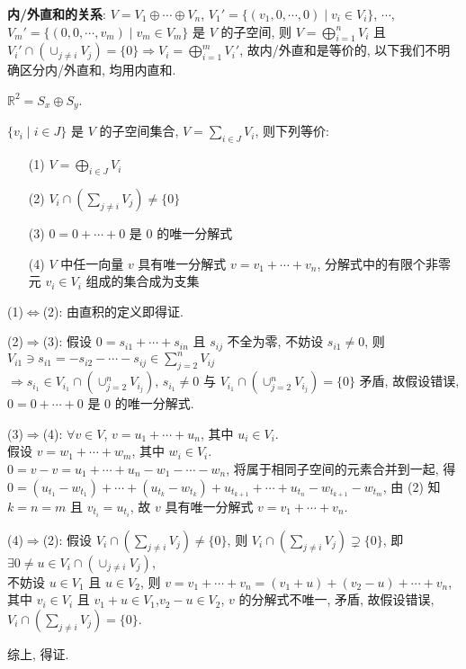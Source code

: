 \documentclass{note}
\begin{document}
\textbf{内/外直和的关系}:
$V=V_1\oplus\cdots\oplus V_n$, $V_1'=\{(v_1,0,\cdots,0)\mid v_i\in V_i\}$, $\cdots$, $V_m'=\{(0,0,\cdots,v_m)\mid v_m\in V_m\}$ 是 $V$ 的子空间, 则 $V=\bigoplus_{i=1}^nV_i$ 且 $V_i'\cap(\cup_{j\neq i}V_j)=\{0\}\Longrightarrow V_i=\bigoplus_{i=1}^mV_i'$, 故内/外直和是等价的, 以下我们不明确区分内/外直和, 均用内直和.

\begin{eg}
    $\mathbb{R}^2=S_x\oplus S_y$.
\end{eg}

\begin{thm}[(课本定理 1.5)]
    $\{v_i\mid i\in J\}$ 是 $V$ 的子空间集合, $V=\sum_{i\in J}V_i$, 则下列等价:
    \begin{itemize}
        \item[(1)] $V=\bigoplus_{i\in J}V_i$
        \item[(2)] $V_i\cap(\sum_{j\neq i}V_j)\neq\{0\}$
        \item[(3)] $0=0+\cdots+0$ 是 $0$ 的唯一分解式
        \item[(4)] $V$ 中任一向量 $v$ 具有唯一分解式 $v=v_1+\cdots+v_n$, 分解式中的有限个非零元 $v_i\in V_i$ 组成的集合成为支集
    \end{itemize}
\end{thm}
\begin{pf}
    (1)$\Longleftrightarrow$(2): 由直积的定义即得证.

    (2)$\Longrightarrow$(3): 假设 $0=s_{i1}+\cdots+s_{in}$ 且 $s_{ij}$ 不全为零, 不妨设 $s_{i1}\neq 0$, 则 $V_{i1}\ni s_{i1}=-s_{i2}-\cdots-s_{ij}\in\sum_{j=2}^nV_{ij}$\\
    $\Longrightarrow s_{i_1}\in V_{i_1}\cap(\cup_{j=2}^nV_{i_j})$, $s_{i_1}\neq 0$ 与 $V_{i_1}\cap(\cup_{j=2}^nV_{i_j})=\{0\}$ 矛盾, 故假设错误, $0=0+\cdots+0$ 是 $0$ 的唯一分解式.

    (3)$\Longrightarrow$(4): $\forall v\in V$, $v=u_1+\cdots+u_n$, 其中 $u_i\in V_i$.\\
    假设 $v=w_1+\cdots+w_m$, 其中 $w_i\in V_i$.\\
    $0=v-v=u_1+\cdots+u_n-w_1-\cdots-w_n$, 将属于相同子空间的元素合并到一起, 得 $0=(u_{t_1}-w_{t_1})+\cdots+(u_{t_k}-w_{t_k})+u_{t_{k+1}}+\cdots+u_{t_n}-w_{t_{k+1}}-w_{t_m}$, 由 (2) 知 $k=n=m$ 且 $v_{t_i}=u_{t_i}$, 故 $v$ 具有唯一分解式 $v=v_1+\cdots+v_n$.

    (4)$\Longrightarrow$(2): 假设 $V_i\cap(\sum_{j\neq i}V_j)\neq\{0\}$, 则 $V_i\cap(\sum_{j\neq i}V_j)\supsetneq\{0\}$, 即 $\exists 0\neq u\in V_i\cap(\cup_{j\neq i}V_j)$,\\
    不妨设 $u\in V_1$ 且 $u\in V_2$, 则 $v=v_1+\cdots+v_n=(v_1+u)+(v_2-u)+\cdots+v_n$, 其中 $v_i\in V_i$ 且 $v_1+u\in V_1$,$v_2-u\in V_2$, $v$ 的分解式不唯一, 矛盾, 故假设错误, $V_i\cap(\sum_{j\neq i}V_j)=\{0\}$.

    综上, 得证.
\end{pf}
\end{document}
